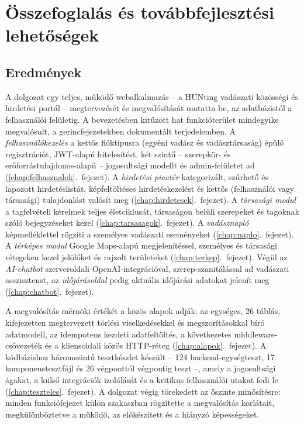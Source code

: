 
\chapter{Összefoglalás és továbbfejlesztési lehetőségek}
\label{chap:osszefoglalas}

\section{Eredmények}
\label{sec:ossz-eredmenyek}

A dolgozat egy teljes, működő webalkalmazás -- a HUNting vadászati közösségi és hirdetési
portál -- megtervezését és megvalósítását mutatta be, az adatbázistól a felhasználói felületig.
A bevezetésben kitűzött hat funkcióterület mindegyike megvalósult, a gerincfejezetekben
dokumentált terjedelemben. A \emph{felhasználókezelés} a kettős fióktípusra (egyéni vadász és
vadásztársaság) épülő regisztrációt, JWT-alapú hitelesítést, két szintű -- szerepkör- és
erőforrástulajdonos-alapú -- jogosultsági modellt és admin-felületet ad
(\ref{chap:felhasznalok}.~fejezet). A \emph{hirdetési piactér} kategorizált, szűrhető és
lapozott hirdetéslistát, képfeltöltéses hirdetéskezelést és kettős (felhasználói vagy
társasági) tulajdonlást valósít meg (\ref{chap:hirdetesek}.~fejezet). A \emph{társasági modul}
a tagfelvételi kérelmek teljes életciklusát, társaságon belüli szerepeket és tagoknak szóló
bejegyzéseket kezel (\ref{chap:tarsasagok}.~fejezet). A \emph{vadásznapló} képmelléklettel
rögzíti a személyes vadászati eseményeket (\ref{chap:naplo}.~fejezet). A \emph{térképes modul}
Google Maps-alapú megjelenítéssel, személyes és társasági rétegeken kezel jelölőket és
rajzolt területeket (\ref{chap:terkep}.~fejezet). Végül az \emph{AI-chatbot} szerveroldali
OpenAI-integrációval, szerep-szanitálással ad vadászati asszisztenst, az
\emph{időjárásoldal} pedig aktuális időjárási adatokat jelenít meg
(\ref{chap:chatbot}.~fejezet).

A megvalósítás mérnöki értékét a közös alapok adják: az egységes, 26 táblás, kifejezetten
megtervezett törlési viselkedésekkel és megszorításokkal bíró adatmodell, az idempotens
kezdeti adatfeltöltés, a következetes middleware-csővezeték és a kliensoldali közös
HTTP-réteg (\ref{chap:alapok}.~fejezet). A kódbázishoz háromszintű tesztkészlet készült --
124 backend-egységteszt, 17 komponenstesztfájl és 26 végponttól végpontig teszt --, amely a
jogosultsági ágakat, a külső integrációk izolálását és a kritikus felhasználói utakat fedi le
(\ref{chap:teszteles}.~fejezet). A dolgozat végig törekedett az őszinte minősítésre: minden
funkciófejezet külön szakaszban rögzítette a megvalósítás korlátait, megkülönböztetve a
működő, az előkészített és a hiányzó képességeket.


